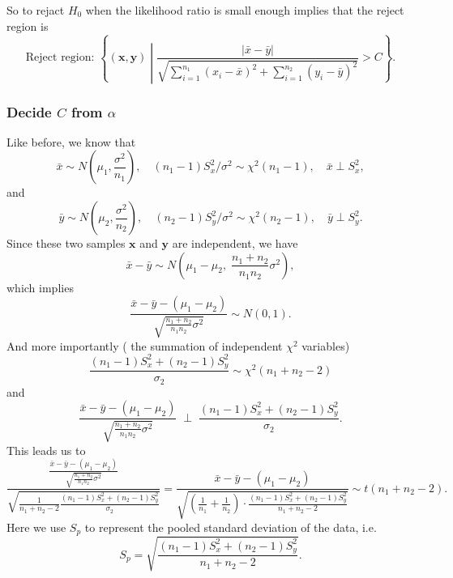 \documentclass[a4paper,12pt]{article}
\begin{document}
So to rejact $H_0$ when the likelihood ratio is small enough implies that the reject region is
\[
  \text{Reject region: }
  \left\{
    \left(\bm{x}, \bm{y}\right)
    \middle|
    \frac{\left|\bar{x} - \bar{y}\right|}{
      \sqrt{
        \sum\limits_{i = 1}^{n_1}\left(x_i - \bar{x}\right)^2
        + \sum\limits_{i = 1}^{n_2}\left(y_i - \bar{y}\right)^2 
      }
    }
    > C
  \right\}
  .
\]

\subsubsection{Decide $C$ from $\alpha$}
\label{sec:decide-c-from-3}

Like before, we know that
\[
  \bar{x} \sim N\left(\mu_1, \frac{\sigma^2}{n_1}\right)
  ,\quad
  \left(n_1 - 1\right)S_x^2 / \sigma^2 \sim \chi^2\left(n_1 - 1\right)
  ,\quad
  \bar{x}\perp S_x^2
  ,
\]
and
\[ 
  \bar{y} \sim N\left(\mu_2, \frac{\sigma^2}{n_2}\right)
  ,\quad
  \left(n_2 - 1\right)S_y^2 / \sigma^2 \sim \chi^2\left(n_2 - 1\right)
  ,\quad
  \bar{y}\perp S_y^2
  .
\]
Since these two samples $\bm{x}$ and $\bm{y}$ are independent, we have
\[
  \bar{x} - \bar{y}
  \sim N\left(
    \mu_1 - \mu_2,\;
    \frac{n_1 + n_2}{n_1n_2}\sigma^2
  \right)
  ,
\]
which implies
\[
  \frac{\bar{x} - \bar{y} - \left(\mu_1 - \mu_2\right)}{
    \sqrt{
      \frac{n_1 + n_2}{n_1n_2}\sigma^2
    }
  }
  \sim N\left(0, 1\right)
  .
\]
And more importantly ({\color{red} the summation of independent $\chi^2$ variables})
\[
  \frac{
    \left(n_1 - 1\right)S_x^2 + \left(n_2 - 1\right)S_y^2
  }{\sigma_2}
  \sim \chi^2\left(n_1 + n_2 - 2\right)
\]
and
\[
  \frac{\bar{x} - \bar{y} - \left(\mu_1 - \mu_2\right)}{
    \sqrt{
      \frac{n_1 + n_2}{n_1n_2}\sigma^2
    }
  }
  \;\bm{\perp}\;
  \frac{
    \left(n_1 - 1\right)S_x^2 + \left(n_2 - 1\right)S_y^2
  }{\sigma_2}
  .
\]
This leads us to
\[
  \frac{
    \frac{\bar{x} - \bar{y} - \left(\mu_1 - \mu_2\right)}{
      \sqrt{
        \frac{n_1 + n_2}{n_1n_2}\sigma^2
      }
    }
  }{
    \sqrt{
      \frac{1}{n_1 + n_2 - 2}
      \frac{
        \left(n_1 - 1\right)S_x^2 + \left(n_2 - 1\right)S_y^2
      }{\sigma_2}
    }
  }
  = \frac{
    \bar{x} - \bar{y} - \left(\mu_1 - \mu_2\right)
  }{\sqrt{
      \left(
        \frac{1}{n_1} + \frac{1}{n_2}
      \right)
      \cdot
      \frac{
        \left(n_1 - 1\right)S_x^2 + \left(n_2 - 1\right)S_y^2
      }{
        n_1 + n_2 - 2
      }
    }
  }
  \sim t(n_1 + n_2 - 2)
  .
\]
Here we use $S_p$ to represent the pooled standard deviation of the data, i.e.
\[
  S_p = \sqrt{
    \frac{
      \left(n_1 - 1\right)S_x^2 + \left(n_2 - 1\right)S_y^2
    }{
      n_1 + n_2 - 2
    }
  }
  .
\]
\end{document}
